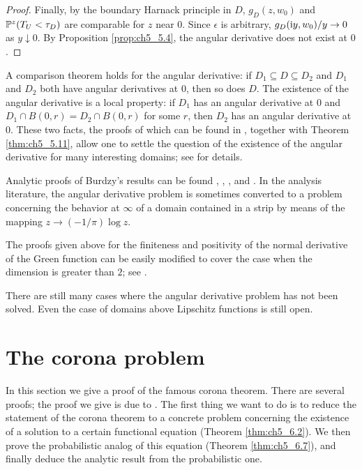 \begin{proof}
Finally, by the boundary Harnack principle in $D$, $g_D(z,w_0)$ and $\P^z(T_U < \tau_D)$ are comparable for $z$ near $0$. Since $\epsilon$ is arbitrary, $g_D(\im y,w_0)/y \allowbreak\to 0$ as $y \downarrow 0$. By Proposition \ref{prop:ch5_5.4}, the angular derivative does not exist at $0$.
\end{proof}

A comparison theorem holds for the angular derivative: if $D_1 \subseteq D \subseteq D_2$ and $D_1$ and $D_2$ both have angular derivatives at $0$, then so does $D$. The existence of the angular derivative is a local property: if $D_1$ has an angular derivative at $0$ and $D_1 \cap B(0,r) = D_2 \cap B(0,r)$ for some $r$, then $D_2$ has an angular derivative at $0$. These two facts, the proofs of which can be found in \cite{Burdzy1987}, together with Theorem \ref{thm:ch5_5.11}, allow one to settle the question of the existence of the angular derivative for many interesting domains; see \cite{Burdzy1987} for details.

Analytic proofs of Burdzy's results can be found \cite{RodinWarschawski1986}, \cite{Carroll1988}, \cite{Gardiner1991}, and \cite{Sastry1993}. In the analysis literature, the angular derivative problem is sometimes converted to a problem concerning the behavior at $\infty$ of a domain contained in a strip by means of the mapping $z \to (-1/\pi)\log z$.

\mpagebreak

The proofs given above for the finiteness and positivity of the normal derivative of the Green function can be easily modified to cover the case when the dimension is greater than $2$; see \cite{Burdzy1987}.

There are still many cases where the angular derivative problem has not been solved. Even the case of domains above Lipschitz functions is still open.

\section{The corona problem}\label{ch5_sec6}


In this section we give a proof of the famous corona theorem. There are several proofs; the proof we give is due to \cite{Varopoulos1980b}. The first thing we want to do is to reduce the statement of the corona theorem to a concrete problem concerning the existence of a solution to a certain functional equation (Theorem \ref{thm:ch5_6.2}). We then prove the probabilistic analog of this equation (Theorem \ref{thm:ch5_6.7}), and finally deduce the analytic result from the probabilistic one.

